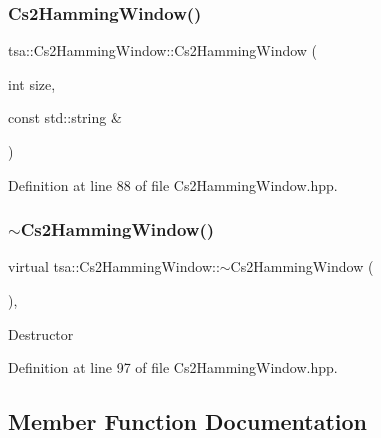 \subsubsection{\texorpdfstring{Cs2\+Hamming\+Window()}{Cs2HammingWindow()}\hspace{0.1cm}{\footnotesize\ttfamily [2/2]}}
{\footnotesize\ttfamily tsa\+::\+Cs2\+Hamming\+Window\+::\+Cs2\+Hamming\+Window (\begin{DoxyParamCaption}\item[{int}]{size,  }\item[{const std\+::string \&}]{ }\end{DoxyParamCaption})\hspace{0.3cm}{\ttfamily [inline]}}



Definition at line 88 of file Cs2\+Hamming\+Window.\+hpp.

\mbox{\label{classtsa_1_1_cs2_hamming_window_a42a7009a9fc8e56f2508cd7d7f563fa3}} 
\subsubsection{\texorpdfstring{$\sim$\+Cs2\+Hamming\+Window()}{~Cs2HammingWindow()}}
{\footnotesize\ttfamily virtual tsa\+::\+Cs2\+Hamming\+Window\+::$\sim$\+Cs2\+Hamming\+Window (\begin{DoxyParamCaption}{ }\end{DoxyParamCaption})\hspace{0.3cm}{\ttfamily [inline]}, {\ttfamily [virtual]}}

Destructor 

Definition at line 97 of file Cs2\+Hamming\+Window.\+hpp.



\subsection{Member Function Documentation}
\mbox{\label{classtsa_1_1_cs2_hamming_window_a269a092db403a2bd7bb93456dc39be60}} 
